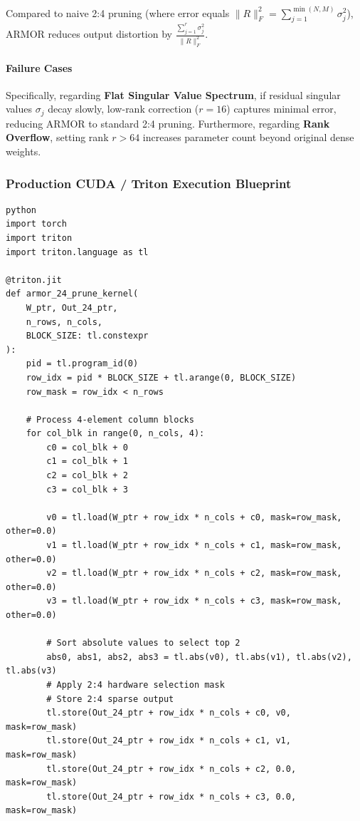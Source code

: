 Compared to naive 2:4 pruning (where error equals $\| R \|_F^2 = \sum_{j=1}^{\min(N, M)} \sigma_j^2$), ARMOR reduces output distortion by $\frac{\sum_{j=1}^r \sigma_j^2}{\| R \|_F^2}$.

\paragraph{Failure Cases}

Specifically, regarding \textbf{Flat Singular Value Spectrum}, if residual singular values $\sigma_j$ decay slowly, low-rank correction ($r=16$) captures minimal error, reducing ARMOR to standard 2:4 pruning. Furthermore, regarding \textbf{Rank Overflow}, setting rank $r > 64$ increases parameter count beyond original dense weights.



\subsubsection*{Production CUDA / Triton Execution Blueprint}

\vspace{0.5em}
\begin{mdframed}[backgroundcolor=codebg, linecolor=codeframe, linewidth=1pt, roundcorner=4pt, innerleftmargin=2pt, innerrightmargin=5pt, innertopmargin=5pt, innerbottommargin=5pt]
\begin{lstlisting}
python
import torch
import triton
import triton.language as tl

@triton.jit
def armor_24_prune_kernel(
    W_ptr, Out_24_ptr,
    n_rows, n_cols,
    BLOCK_SIZE: tl.constexpr
):
    pid = tl.program_id(0)
    row_idx = pid * BLOCK_SIZE + tl.arange(0, BLOCK_SIZE)
    row_mask = row_idx < n_rows

    # Process 4-element column blocks
    for col_blk in range(0, n_cols, 4):
        c0 = col_blk + 0
        c1 = col_blk + 1
        c2 = col_blk + 2
        c3 = col_blk + 3

        v0 = tl.load(W_ptr + row_idx * n_cols + c0, mask=row_mask, other=0.0)
        v1 = tl.load(W_ptr + row_idx * n_cols + c1, mask=row_mask, other=0.0)
        v2 = tl.load(W_ptr + row_idx * n_cols + c2, mask=row_mask, other=0.0)
        v3 = tl.load(W_ptr + row_idx * n_cols + c3, mask=row_mask, other=0.0)

        # Sort absolute values to select top 2
        abs0, abs1, abs2, abs3 = tl.abs(v0), tl.abs(v1), tl.abs(v2), tl.abs(v3)
        # Apply 2:4 hardware selection mask
        # Store 2:4 sparse output
        tl.store(Out_24_ptr + row_idx * n_cols + c0, v0, mask=row_mask)
        tl.store(Out_24_ptr + row_idx * n_cols + c1, v1, mask=row_mask)
        tl.store(Out_24_ptr + row_idx * n_cols + c2, 0.0, mask=row_mask)
        tl.store(Out_24_ptr + row_idx * n_cols + c3, 0.0, mask=row_mask)
\end{lstlisting}
\end{mdframed}
\vspace{0.5em}



